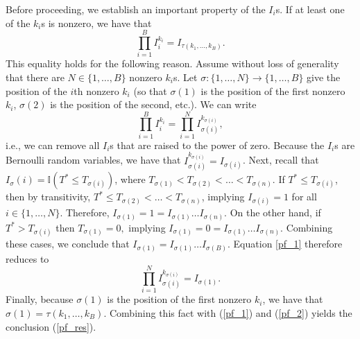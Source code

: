 \documentclass[12pt]{article}
\begin{document}
\begin{appendices}
Before proceeding, we establish an important property of the $I_i$s. If at least one of the $k_i$s is nonzero, we have that
\begin{equation}\label{pf_res}
 \prod_{i=1}^B I^{k_i}_i = I_{\tau(k_1, \dots, k_B)}.
 \end{equation}
This equality holds for the following reason. Assume without loss of generality that there are $N \in \{1, \dots, B\}$ nonzero $k_i$s. Let $\sigma: \{1, \dots, N\} \to \{1, \dots, B\}$ give the position of the $i$th nonzero $k_i$ (so that $\sigma(1)$ is the position of the first nonzero $k_i$, $\sigma(2)$ is the position of the second, etc.). We can write
\begin{equation}\label{pf_1}
\prod_{i=1}^B I_i^{k_i} = \prod_{i=1}^N I_{\sigma(i)}^{k_{\sigma(i)}},
\end{equation} 
i.e., we can remove all $I_i$s that are raised to the power of zero. Because the $I_i$s are Bernoulli random variables, we have that $I_{\sigma(i)}^{ k_{\sigma(i)}} = I_{\sigma(i)}$. Next, recall that $I_\sigma(i) = \mathbb{I}\left( T^* \leq T_{\sigma(i)} \right)$, where $T_{\sigma(1)} < T_{\sigma(2)} < \dots < T_{\sigma(n)}.$ If $T^* \leq T_{\sigma(i)}$, then by transitivity, $T^* \leq T_{\sigma(2)} < \dots < T_{\sigma(n)}$, implying $I_{\sigma(i)} = 1$ for all $i \in \{1, \dots, N\}.$ Therefore, $I_{\sigma(1)} = 1 = I_{\sigma(1)} \dots I_{\sigma(n)}.$ On the other hand, if $T^* > T_{\sigma(i)}$ then $T_{\sigma(1)} = 0,$ implying $I_{\sigma(1)} = 0 = I_{\sigma(1)} \dots I_{\sigma(n)}$. Combining these cases, we conclude that $I_{\sigma(1)} = I_{\sigma(1)} \dots I_{\sigma(B)}$. Equation \ref{pf_1} therefore reduces to
\begin{equation}\label{pf_2}
\prod_{i=1}^N I_{\sigma(i)}^{k_{\sigma(i)}} = I_{\sigma(1)}.
\end{equation}
 Finally, because $\sigma(1)$ is the position of the first nonzero $k_i$, we have that $\sigma(1) = \tau(k_1, \dots, k_B).$ Combining this fact with (\ref{pf_1}) and (\ref{pf_2}) yields the conclusion (\ref{pf_res}).


\end{appendices}
\end{document}
